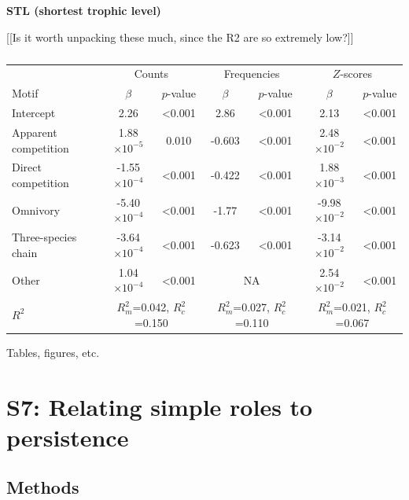 \documentclass[12pt]{article}
\begin{document}
\begin{spacing}{2.0}
		\textbf{STL (shortest trophic level)}


			[[Is it worth unpacking these much, since the R2 are so extremely low?]]


			\begin{table}[h!]
			\caption{}
			\label{tab:motifs_vs_STL}
			\begin{tabular}{l | c c | c c | c c}
			& \multicolumn{2}{|c|}{Counts} & \multicolumn{2}{c}{Frequencies} & \multicolumn{2}{|c}{$Z$-scores} \\
			Motif & $\beta$ & $p$-value & $\beta$ & $p$-value & $\beta$ & $p$-value \\
			\hline
			Intercept & 2.26 & \textless0.001 & 2.86 & \textless0.001 & 2.13 & \textless0.001 \\
			\hline
			Apparent competition & 1.88$\times10^{-5}$ & 0.010 & -0.603 & \textless0.001 & 2.48$\times10^{-2}$ & \textless0.001 \\
			Direct competition   & -1.55$\times10^{-4}$ & \textless0.001 & -0.422 & \textless0.001 & 1.88$\times10^{-3}$ & \textless0.001 \\
			Omnivory       & -5.40$\times10^{-4}$ & \textless0.001 & -1.77 & \textless0.001 & -9.98$\times10^{-2}$ & \textless0.001 \\
			Three-species chain  & -3.64$\times10^{-4}$ & \textless0.001 & -0.623 & \textless0.001 & -3.14$\times10^{-2}$ & \textless0.001 \\
			Other    & 1.04$\times10^{-4}$ & \textless0.001 & \multicolumn{2}{c|}{NA} & 2.54$\times10^{-2}$ & \textless0.001 \\
			\hline
			$R^2$ & \multicolumn{2}{|c|}{$R^2_m$=0.042, $R^2_c$=0.150} & 
			\multicolumn{2}{c}{$R^2_m$=0.027, $R^2_c$=0.110} & 
			\multicolumn{2}{|c}{$R^2_m$=0.021, $R^2_c$=0.067} \\
			\end{tabular}
			\end{table}



		Tables, figures, etc.


\clearpage



\section*{S7: Relating simple roles to persistence}

	\subsection*{Methods}


\end{spacing}
\end{document}
